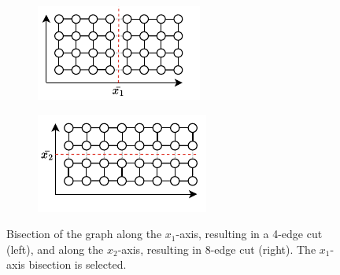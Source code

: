 \begin{figure}[h!]
    \centering
    \begin{subfigure}[b]{0.23\textwidth}
        \centering
        \includegraphics[width=\textwidth]{images/coord_1.drawio.svg.pdf}
        \caption{}
        \label{fig:coord_1}
    \end{subfigure}
    \hfill
    \begin{subfigure}[b]{0.23\textwidth}
        \centering
        \includegraphics[width=\textwidth]{images/coord_2.drawio.svg.pdf}
        \caption{}
        \label{fig:coord_2}
    \end{subfigure}
    \caption{Bisection of the graph along the $x_1$-axis, resulting in a 4-edge cut (left),
    and along the $x_2$-axis, resulting in 8-edge cut (right). The $x_1$-axis bisection is selected.}
    \label{fig:coord}
\end{figure}